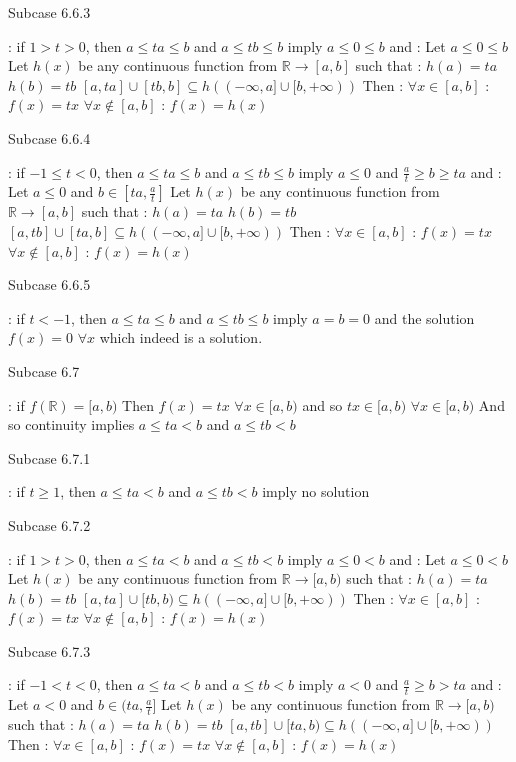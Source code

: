 \begin{solution}
\begin{tcolorbox}
\begin{bolded}Subcase 6.6.3\end{bolded} : if $1>t>0$, then $a\le ta\le b$ and $a\le tb\le b$ imply $a\le 0\le b$ and :
Let $a\le 0\le b$
Let $h(x)$ be any continuous function from $\mathbb R\to[a,b]$ such that :
$h(a)=ta$
$h(b)=tb$
$[a,ta]\cup[tb,b]\subseteq h((-\infty,a]\cup[b,+\infty))$
Then :
$\forall x\in[a,b]$ : $f(x)=tx$
$\forall x\notin[a,b]$ : $f(x)=h(x)$

\begin{bolded}Subcase 6.6.4\end{bolded} : if $-1\le t<0$, then $a\le ta\le b$ and $a\le tb\le b$ imply $a\le 0$ and $\frac at\ge b\ge ta$ and :
Let $a\le 0$ and $b\in[ta,\frac at]$
Let $h(x)$ be any continuous function from $\mathbb R\to[a,b]$ such that :
$h(a)=ta$
$h(b)=tb$
$[a,tb]\cup[ta,b]\subseteq h((-\infty,a]\cup[b,+\infty))$
Then :
$\forall x\in[a,b]$ : $f(x)=tx$
$\forall x\notin[a,b]$ : $f(x)=h(x)$

\begin{bolded}Subcase 6.6.5 \end{bolded}: if $t<-1$, then $a\le ta\le b$ and $a\le tb\le b$ imply $a=b=0$ and the solution $f(x)=0$ $\forall x$ which indeed is a solution.

\begin{bolded}Subcase 6.7\end{bolded} : if $f(\mathbb R)=[a,b)$
Then $f(x)=tx$ $\forall x\in [a,b)$ and so $tx\in[a,b)$ $\forall x\in[a,b)$
And so continuity implies $a\le ta< b$ and $a\le tb< b$

\begin{bolded}Subcase 6.7.1\end{bolded} : if $t\ge 1$, then $a\le ta< b$ and $a\le tb< b$ imply no solution

\begin{bolded}Subcase 6.7.2\end{bolded} : if $1>t>0$, then $a\le ta< b$ and $a\le tb< b$ imply $a\le 0< b$ and :
Let $a\le 0< b$
Let $h(x)$ be any continuous function from $\mathbb R\to[a,b)$ such that :
$h(a)=ta$
$h(b)=tb$
$[a,ta]\cup[tb,b)\subseteq h((-\infty,a]\cup[b,+\infty))$
Then :
$\forall x\in[a,b]$ : $f(x)=tx$
$\forall x\notin[a,b]$ : $f(x)=h(x)$

\begin{bolded}Subcase 6.7.3\end{bolded} : if $-1< t<0$, then $a\le ta< b$ and $a\le tb< b$ imply $a<0$ and $\frac at\ge b> ta$ and :
Let $a<0$ and $b\in(ta,\frac at]$
Let $h(x)$ be any continuous function from $\mathbb R\to[a,b)$ such that :
$h(a)=ta$
$h(b)=tb$
$[a,tb]\cup[ta,b)\subseteq h((-\infty,a]\cup[b,+\infty))$
Then :
$\forall x\in[a,b]$ : $f(x)=tx$
$\forall x\notin[a,b]$ : $f(x)=h(x)$


\end{tcolorbox}
\end{solution}
